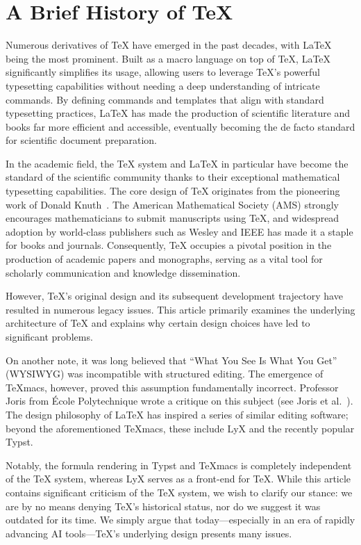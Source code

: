 \section{A Brief History of \TeX}

Numerous derivatives of \TeX{} have emerged in the past decades, with \LaTeX{} being the most prominent. Built as a macro language on top of \TeX{}, \LaTeX{} significantly simplifies its usage, allowing users to leverage \TeX{}'s powerful typesetting capabilities without needing a deep understanding of intricate commands. By defining commands and templates that align with standard typesetting practices, \LaTeX{} has made the production of scientific literature and books far more efficient and accessible, eventually becoming the de facto standard for scientific document preparation.

In the academic field, the \TeX{} system and \LaTeX{} in particular have become the standard of the scientific community thanks to their exceptional mathematical typesetting capabilities. The core design of \TeX{} originates from the pioneering work of Donald Knuth~\cite{knuth1984texbook}. The American Mathematical Society (AMS) strongly encourages mathematicians to submit manuscripts using \TeX{}, and widespread adoption by world-class publishers such as Wesley and IEEE has made it a staple for books and journals. Consequently, \TeX{} occupies a pivotal position in the production of academic papers and monographs, serving as a vital tool for scholarly communication and knowledge dissemination.

However, \TeX{}'s original design and its subsequent development trajectory have resulted in numerous legacy issues. This article primarily examines the underlying architecture of \TeX{} and explains why certain design choices have led to significant problems.

On another note, it was long believed that ``What You See Is What You Get'' (WYSIWYG) was incompatible with structured editing. The emergence of \TeX{}macs, however, proved this assumption fundamentally incorrect. Professor Joris from \'Ecole Polytechnique wrote a critique on this subject (see Joris et al.~\cite{van_der_hoeven_gnu_2001, liiistem2025}). The design philosophy of \LaTeX{} has inspired a series of similar editing software; beyond the aforementioned \TeX{}macs, these include LyX and the recently popular Typst.

Notably, the formula rendering in Typst and \TeX{}macs is completely independent of the \TeX{} system, whereas LyX serves as a front-end for \TeX{}. While this article contains significant criticism of the \TeX{} system, we wish to clarify our stance: we are by no means denying \TeX{}'s historical status, nor do we suggest it was outdated for its time. We simply argue that today---especially in an era of rapidly advancing AI tools---\TeX{}'s underlying design presents many issues.
